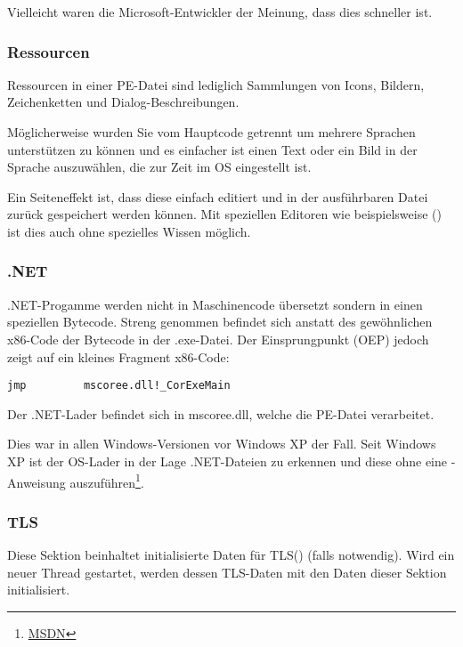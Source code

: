 Vielleicht waren die Microsoft-Entwickler der Meinung, dass dies schneller ist.

\subsubsection{Ressourcen}

\label{PEresources}

Ressourcen in einer PE-Datei sind lediglich Sammlungen von Icons, Bildern,
Zeichenketten und Dialog-Beschreibungen.

Möglicherweise wurden Sie vom Hauptcode getrennt um mehrere Sprachen unterstützen
zu können und es einfacher ist einen Text oder ein Bild in der Sprache auszuwählen,
die zur Zeit im \ac{OS} eingestellt ist.

Ein Seiteneffekt ist, dass diese einfach editiert und in der ausführbaren Datei
zurück gespeichert werden können. Mit speziellen Editoren wie beispielsweise
() ist dies auch ohne spezielles Wissen möglich.

\subsubsection{.NET}


.NET-Progamme werden nicht in Maschinencode übersetzt sondern in einen speziellen Bytecode.
Streng genommen befindet sich anstatt des gewöhnlichen x86-Code der Bytecode in
der .exe-Datei. Der Einsprungpunkt (\ac{OEP}) jedoch zeigt auf ein kleines Fragment
x86-Code:

\begin{lstlisting}
jmp         mscoree.dll!_CorExeMain
\end{lstlisting}

Der .NET-Lader befindet sich in mscoree.dll, welche die PE-Datei verarbeitet.

Dies war in allen Windows-Versionen vor Windows XP der Fall. Seit Windows XP
ist der \ac{OS}-Lader in der Lage .NET-Dateien zu erkennen und diese ohne eine
\JMP-Anweisung auszuführen\footnote{\href{http://go.yurichev.com/17051}{MSDN}}.

\subsubsection{TLS}

Diese Sektion beinhaltet initialisierte Daten für \ac{TLS}() (falls notwendig).
Wird ein neuer Thread gestartet, werden dessen \ac{TLS}-Daten mit den Daten dieser
Sektion initialisiert.

